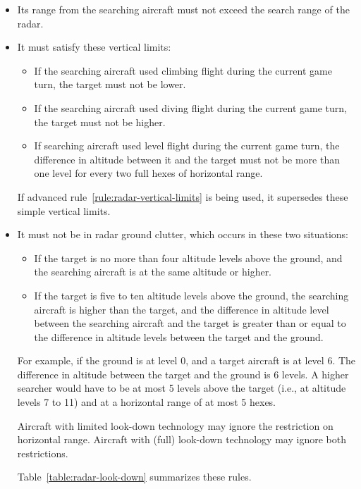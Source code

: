 {\begin{itemize}
    \item Its range from the searching aircraft must not exceed the search range of the radar.

    \item It must satisfy these vertical limits:
    \begin{itemize}
        \item If the searching aircraft used climbing flight during the current game turn, the target must not be lower.
        \item If the searching aircraft used diving flight during the current game turn, the target must not be higher.
        \item If searching aircraft used level flight during the current game turn, the difference in altitude between it and the target must not be more than one level for every two full hexes of horizontal range.
    \end{itemize}

    If advanced rule~\ref{rule:radar-vertical-limits} is being used, it supersedes these simple vertical limits.

    \item It must not be in radar ground clutter, which occurs in these two situations:

    \begin{itemize}
        \item If the target is no more than four altitude levels above the ground, and the searching aircraft is at the same altitude or higher.
        \item If the target is five to ten altitude levels above the ground, the searching aircraft is higher than the target, and the difference in altitude level between the searching aircraft and the target is greater than or equal to the difference in altitude levels between the target and the ground.
        
    \end{itemize}

    For example, if the ground is at level 0, and a target aircraft is at level 6. The difference in altitude between the target and the ground is 6 levels. A higher searcher would have to be at most 5 levels above the target (i.e., at altitude levels 7 to 11) and at a horizontal range of at most 5 hexes.

    Aircraft with limited look-down technology may ignore the restriction on horizontal range. Aircraft with (full) look-down technology may ignore both restrictions.
    
    Table~\ref{table:radar-look-down} summarizes these rules.
    

    \end{itemize}
    
    
}

